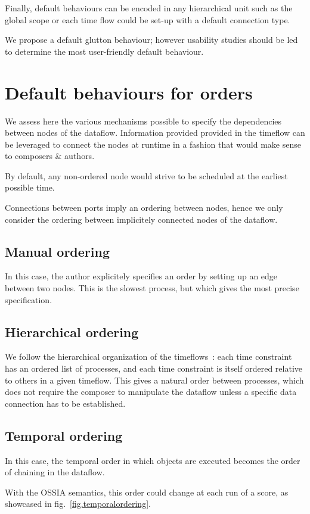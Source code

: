 \documentclass{article}
\begin{document}
Finally, default behaviours can be encoded in any hierarchical unit such as the global scope or each time flow could be set-up with a default connection type.

We propose a default glutton behaviour; however usability studies should be led to determine the most user-friendly default behaviour.


\section{Default behaviours for orders}
\label{sec.order}
We assess here the various mechanisms possible to specify the dependencies between nodes of the dataflow.
Information provided provided in the timeflow can be leveraged to connect the nodes at runtime in a fashion 
that would make sense to composers \& authors.
    
By default, any non-ordered node would strive to be scheduled at the earliest possible time.
    
Connections between ports imply an ordering between nodes, hence we only consider the ordering between implicitely connected nodes of the dataflow.
    
\subsection{Manual ordering}
In this case, the author explicitely specifies an order by setting up an edge between two nodes. 
This is the slowest process, but which gives the most precise specification.
    
\subsection{Hierarchical ordering}
We follow the hierarchical organization of the timeflows~: each time constraint has an ordered list of processes, and each time constraint is itself ordered relative to others in a given timeflow. 
This gives a natural order between processes, which does not require the composer to manipulate the dataflow unless a specific data connection has to be established.
    
\subsection{Temporal ordering}
In this case, the temporal order in which objects are executed
becomes the order of chaining in the dataflow.

With the OSSIA semantics, this order could change at each run of a score, as showcased in fig.~\ref{fig.temporalordering}.
    
\end{document}
